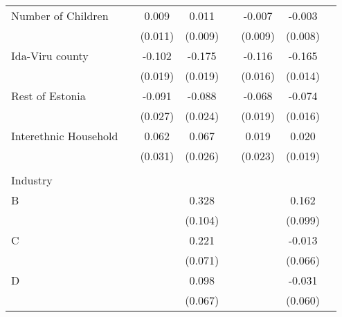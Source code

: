 \begin{longtable}{l*{3}{c}|l*{3}{c}}
	Number of Children  &                     &       0.009         &       0.011         &                     &      -0.007         &      -0.003         \\
	&                     &     (0.011)         &     (0.009)         &                     &     (0.009)         &     (0.008)         \\
Ida-Viru county            &                     &      -0.102\sym{***}&      -0.175\sym{***}&                     &      -0.116\sym{***}&      -0.165\sym{***}\\
&                     &     (0.019)         &     (0.019)         &                     &     (0.016)         &     (0.014)         \\
Rest of Estonia                &                     &      -0.091\sym{***}&      -0.088\sym{***}&                     &      -0.068\sym{***}&      -0.074\sym{***}\\
&                     &     (0.027)         &     (0.024)         &                     &     (0.019)         &     (0.016)         \\
	Interethnic Household&                     &       0.062\sym{**} &       0.067\sym{**} &                     &       0.019         &       0.020         \\
	&                     &     (0.031)         &     (0.026)         &                     &     (0.023)         &     (0.019)         \\
	&&&&&&&\\
	Industry &&&&&&\\
	B                   &                     &                     &       0.328\sym{***}&                     &                     &       0.162         \\
	&                     &                     &     (0.104)         &                     &                     &     (0.099)         \\
	C                   &                     &                     &       0.221\sym{***}&                     &                     &      -0.013         \\
	&                     &                     &     (0.071)         &                     &                     &     (0.066)         \\
	D                   &                     &                     &       0.098         &                     &                     &      -0.031         \\
	&                     &                     &     (0.067)         &                     &                     &     (0.060)         \\

\end{longtable}
